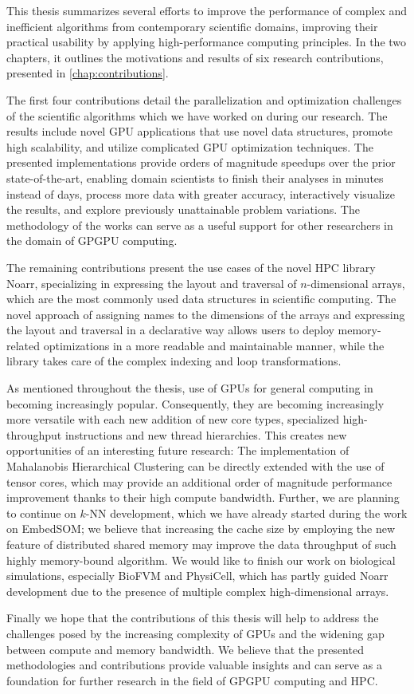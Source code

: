 
This thesis summarizes several efforts to improve the performance of complex and inefficient algorithms from contemporary scientific domains, improving their practical usability by applying high-performance computing principles. In the two chapters, it outlines the motivations and results of six research contributions, presented in \cref{chap:contributions}.

The first four contributions detail the parallelization and optimization challenges of the scientific algorithms which we have worked on during our research. The results include novel GPU applications that use novel data structures, promote high scalability, and utilize complicated GPU optimization techniques. The presented implementations provide orders of magnitude speedups over the prior state-of-the-art, enabling domain scientists to finish their analyses in minutes instead of days, process more data with greater accuracy, interactively visualize the results, and explore previously unattainable problem variations. The methodology of the works can serve as a useful support for other researchers in the domain of GPGPU computing.

The remaining contributions present the use cases of the novel HPC library Noarr, specializing in expressing the layout and traversal of $n$-dimensional arrays, which are the most commonly used data structures in scientific computing. The novel approach of assigning names to the dimensions of the arrays and expressing the layout and traversal in a declarative way allows users to deploy memory-related optimizations in a more readable and maintainable manner, while the library takes care of the complex indexing and loop transformations.

As mentioned throughout the thesis, use of GPUs for general computing in becoming increasingly popular. Consequently, they are becoming increasingly more versatile with each new addition of new core types, specialized high-throughput instructions and new thread hierarchies. This creates new opportunities of an interesting future research: The implementation of Mahalanobis Hierarchical Clustering can be directly extended with the use of tensor cores, which may provide an additional order of magnitude performance improvement thanks to their high compute bandwidth. Further, we are planning to continue on $k$-NN development, which we have already started during the work on EmbedSOM; we believe that increasing the cache size by employing the new feature of distributed shared memory may improve the data throughput of such highly memory-bound algorithm. We would like to finish our work on biological simulations, especially BioFVM and PhysiCell, which has partly guided Noarr development due to the presence of multiple complex high-dimensional arrays.

Finally we hope that the contributions of this thesis will help to address the challenges posed by the increasing complexity of GPUs and the widening gap between compute and memory bandwidth. We believe that the presented methodologies and contributions provide valuable insights and can serve as a foundation for further research in the field of GPGPU computing and HPC.
